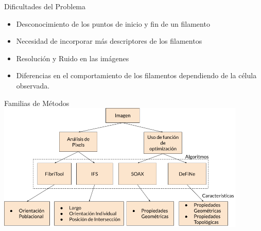 \documentclass[]{beamer}
\begin{document}
\begin{frame}{Dificultades del Problema}
    \begin{itemize}
        \item Desconocimiento de los puntos de inicio y fin de un filamento
        \item Necesidad de incorporar m\'as descriptores de los filamentos
        \item Resoluci\'on y Ruido en las im\'agenes
        \item Diferencias en el comportamiento de los filamentos dependiendo de la c\'elula observada.
    \end{itemize}
\end{frame}

\begin{frame}{Familias de M\'etodos}
    \hspace{-1cm}
    \centering
    \includegraphics[height=2.4in]{Pictures/familiasDeMetodos.png}
\end{frame}
\end{document}

